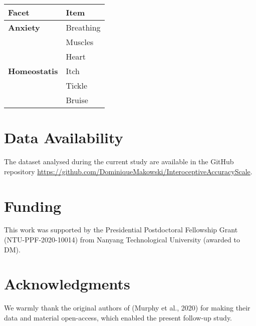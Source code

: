 \documentclass[
  man,floatsintext]{apa6}
\begin{document}
\begin{table}[!h]

\begin{center}
\begin{threeparttable}

\caption{\label{tab:unnamed-chunk-2}}

\scriptsize{

\begin{tabular}{ll}
\toprule
Facet & Item\\
\midrule
\textbf{Anxiety} & Breathing\\
 & Muscles\\
 & Heart\\ \midrule
\textbf{Homeostatis} & Itch\\
 & Tickle\\
 & Bruise\\
\bottomrule
\end{tabular}

}

\end{threeparttable}
\end{center}

\end{table}

\newpage

\hypertarget{data-availability}{%
\section{Data Availability}\label{data-availability}}

The dataset analysed during the current study are available in the GitHub repository \url{https://github.com/DominiqueMakowski/InteroceptiveAccuracyScale}.

\hypertarget{funding}{%
\section{Funding}\label{funding}}

This work was supported by the Presidential Postdoctoral Fellowship Grant (NTU-PPF-2020-10014) from Nanyang Technological University (awarded to DM).

\hypertarget{acknowledgments}{%
\section{Acknowledgments}\label{acknowledgments}}

We warmly thank the original authors of (Murphy et al., 2020) for making their data and material open-access, which enabled the present follow-up study.
\end{document}
